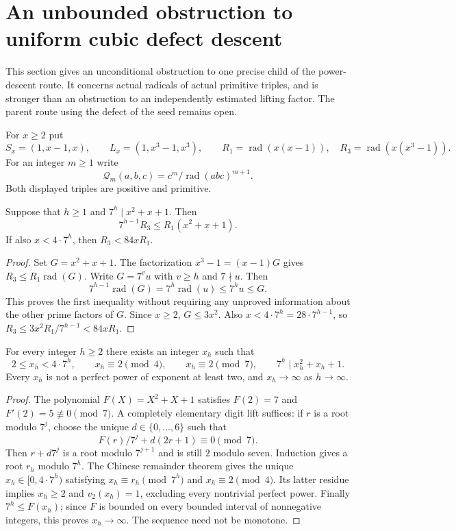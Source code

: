 \section{An unbounded obstruction to uniform cubic defect descent}
\label{sec:aa-cubic-amplification}
This section gives an unconditional obstruction to one precise child of the
power-descent route. It concerns actual radicals of actual primitive triples,
and is stronger than an obstruction to an independently estimated lifting
factor. The parent route using the defect of the seed remains open.

For $x\ge2$ put
\[
 S_x=(1,x-1,x),\qquad L_x=(1,x^3-1,x^3),\qquad
 R_1=\operatorname{rad}(x(x-1)),\quad
 R_3=\operatorname{rad}(x(x^3-1)).
\]
For an integer $m\ge1$ write
\[
 \mathcal Q_m(a,b,c)=c^m/\operatorname{rad}(abc)^{m+1}.
\]
Both displayed triples are positive and primitive.

\begin{lemma}
\label{lem:aa-compression}
Suppose that $h\ge1$ and $7^h\mid x^2+x+1$. Then
\[
 7^{h-1}R_3\le R_1(x^2+x+1).
\]
If also $x<4\cdot7^h$, then $R_3<84xR_1$.
\end{lemma}
\begin{proof}
Set $G=x^2+x+1$. The factorization $x^3-1=(x-1)G$ gives
$R_3\le R_1\operatorname{rad}(G)$. Write $G=7^v u$ with
$v\ge h$ and $7\nmid u$. Then
\[
 7^{h-1}\operatorname{rad}(G)
 =7^h\operatorname{rad}(u)\le7^h u\le G.
\]
This proves the first inequality without requiring any unproved information
about the other prime factors of $G$. Since $x\ge2$, $G\le3x^2$.
Also $x<4\cdot7^h=28\cdot7^{h-1}$, so
$R_3\le3x^2R_1/7^{h-1}<84xR_1$.
\end{proof}

\begin{lemma}
\label{lem:aa-bases}
For every integer $h\ge2$ there exists an integer $x_h$ such that
\[
 2\le x_h<4\cdot7^h,\qquad x_h\equiv2\pmod4,\qquad
 x_h\equiv2\pmod7,\qquad 7^h\mid x_h^2+x_h+1.
\]
Every $x_h$ is not a perfect power of exponent at least two, and
$x_h\longrightarrow\infty$ as $h\longrightarrow\infty$.
\end{lemma}
\begin{proof}
The polynomial $F(X)=X^2+X+1$ satisfies $F(2)=7$ and
$F'(2)=5\not\equiv0\pmod7$. A completely elementary digit lift suffices:
if $r$ is a root modulo $7^j$, choose the unique $d\in\{0,\ldots,6\}$
such that
\[
 F(r)/7^j+d(2r+1)\equiv0\pmod7.
\]
Then $r+d7^j$ is a root modulo $7^{j+1}$ and is still $2$ modulo seven.
Induction gives a root $r_h$ modulo $7^h$. The Chinese remainder theorem
gives the unique $x_h\in[0,4\cdot7^h)$ satisfying
$x_h\equiv r_h\pmod{7^h}$ and $x_h\equiv2\pmod4$.
Its latter residue implies $x_h\ge2$ and $v_2(x_h)=1$, excluding every
nontrivial perfect power. Finally $7^h\le F(x_h)$; since $F$ is bounded
on every bounded interval of nonnegative integers, this proves
$x_h\to\infty$. The sequence need not be monotone.
\end{proof}

